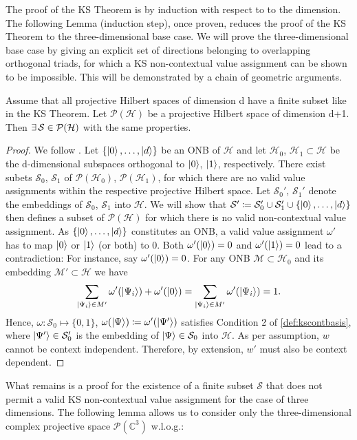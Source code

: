 The proof of the KS Theorem is by induction with respect to to the dimension. The following Lemma (induction step), once proven, reduces the proof of the KS Theorem to the three-dimensional base case. We will prove the three-dimensional base case by giving an explicit set of directions belonging to overlapping orthogonal triads, for which a KS non-contextual value assignment can be shown to be impossible. This will be demonstrated by a chain of geometric arguments.

\begin{lemma}\hfill\break
Assume that all projective Hilbert spaces of dimension d have a finite subset like in the KS Theorem. Let $\mathcal{P}(\mathcal{H})$ be a projective Hilbert space of dimension d+1. Then $\exists\thinspace\mathbb{\mathcal{S}\in\mathcal{P}}(\mathcal{H})$ with the same properties. 
\end{lemma}

\begin{proof}
We follow \cite{Pusey2019}. Let $\{\ket{0},\dots,\ket{d} \}$ be an ONB of $\mathcal{H}$ and let $\mathcal{H}_{0}$, $\mathcal{H}_{1}\subset\mathcal{H}$ be the d-dimensional subspaces orthogonal to $\ket{0}$, $\ket{1}$, respectively. There exist subets $\mathcal{S}_{0}$, $\mathcal{S}_{1}$ of $\mathcal{P}(\mathcal{H}_{0})$, $\mathcal{P}(\mathcal{H}_{1})$, for which there are no valid value assignments within the respective projective Hilbert space. Let $\mathcal{S}_{0}'$, $\mathcal{S}_{1}'$ denote the embeddings of $\mathcal{S}_{0}$, $\mathcal{S}_{1}$ into $\mathcal{H}$. We will show that $\mathcal{S}'\coloneqq\mathcal{S}_{0}'\cup\mathcal{S}_{1}'\cup\{\ket{0},\dots, \ket{d}\}$ then defines a subset of $\mathcal{P}(\mathcal{H})$ for which there is no valid non-contextual value assignment. As $\{\ket{0},\dots,\ket{d} \}$ constitutes an ONB, a valid value assignment $\omega'$ has to map $\ket{0}$ or $\ket{1}$  (or both) to 0. Both $\omega'(\ket{0})=0$ and $\omega'(\ket{1})=0$ lead to a contradiction: For instance, say $\omega'(\ket{0})=0$. For any ONB $\mathcal{M}\subset\mathcal{H}_{0}$ and its embedding $\mathcal{M'}\subset\mathcal{H}$ we have
\begin{equation*}
\sum\limits _{\ket{\Psi_{i}}\in M'}\omega'(\left|\Psi_{i}\right\rangle )+\omega'(\ket{0} )=\sum\limits _{\ket{\Psi_{i}}\in M'}\omega'(\ket{\Psi_{i}})=1.     
\end{equation*}
Hence, $\omega:\mathcal{S}_{0}\mapsto\{0,1\}$, $\omega(\ket{\Psi} )\coloneqq\omega'(\ket{\Psi'})$ satisfies Condition 2 of \ref{def:kscontbasis}, where $\ket{\Psi'} \in\mathcal{S}_{0}'$ is the embedding of $\ket{\Psi} \in\mathcal{S}_{0}$ into $\mathcal{H}$. As per assumption, $w$ cannot be context independent. Therefore, by extension, $w'$ must also be context dependent.
\end{proof}
What remains is a proof for the existence of a finite subset $\mathcal{S}$ that does not permit a valid KS non-contextual value assignment for the case of three dimensions. The following lemma allows us to consider only the three-dimensional complex projective space $\mathcal{P}(\mathbb{C}^{3})$ w.l.o.g.:

